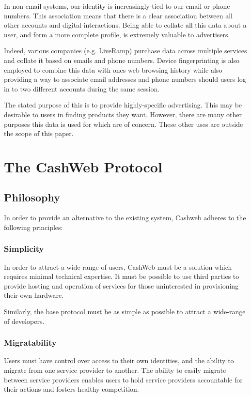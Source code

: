 \documentclass{article}
\begin{document}
In non-email systems, our identity is increasingly tied to our email or phone numbers. This association means that there is a clear association between all other accounts and digital interactions. Being able to collate all this data about a user, and form a more complete profile, is extremely valuable to advertisers.

Indeed, various companies (e.g. LiveRamp) purchase data across multiple services and collate it based on emails and phone numbers. Device fingerprinting is also employed to combine this data with ones web browsing history while also providing a way to associate email addresses and phone numbers should users log in to two different accounts during the same session.

The stated purpose of this is to provide highly-specific advertising. This may be desirable to users in finding products they want. However, there are many other purposes this data is used for which are of concern. These other uses are outside the scope of this paper.

\section{The CashWeb Protocol}

\subsection{Philosophy}

In order to provide an alternative to the existing system, Cashweb adheres to the following principles:

\subsubsection{Simplicity}

In order to attract a wide-range of users, CashWeb must be a solution which requires minimal technical expertise. It must be possible to use third parties to provide hosting and operation of services for those uninterested in provisioning their own hardware.

Similarly, the base protocol must be as simple as possible to attract a wide-range of developers.

\subsubsection{Migratability}

Users must have control over access to their own identities, and the ability to migrate from one service provider to another. The ability to easily migrate between service providers enables users to hold service providers accountable for their actions and fosters healthy competition.
\end{document}

